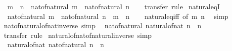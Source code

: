 \begin{isabellebody}
\ \ {\isachardoublequoteopen}m\ {\isacharequal}{\kern0pt}\ n\ {\isasymlongleftrightarrow}\ nat{\isacharunderscore}{\kern0pt}of{\isacharunderscore}{\kern0pt}natural\ m\ {\isacharequal}{\kern0pt}\ nat{\isacharunderscore}{\kern0pt}of{\isacharunderscore}{\kern0pt}natural\ n{\isachardoublequoteclose}\isanewline
%
\isadelimproof
\ \ %
\endisadelimproof
%
\isatagproof
{}\isamarkupfalse%
\ transfer\ rule%
\endisatagproof
{\isafoldproof}%
%
\isadelimproof
\isanewline
%
\endisadelimproof
\isanewline
{}\isamarkupfalse%
\ natural{\isacharunderscore}{\kern0pt}eqI{\isacharcolon}{\kern0pt}\isanewline
\ \ {\isachardoublequoteopen}nat{\isacharunderscore}{\kern0pt}of{\isacharunderscore}{\kern0pt}natural\ m\ {\isacharequal}{\kern0pt}\ nat{\isacharunderscore}{\kern0pt}of{\isacharunderscore}{\kern0pt}natural\ n\ {\isasymLongrightarrow}\ m\ {\isacharequal}{\kern0pt}\ n{\isachardoublequoteclose}\isanewline
%
\isadelimproof
\ \ %
\endisadelimproof
%
\isatagproof
{}\isamarkupfalse%
\ natural{\isacharunderscore}{\kern0pt}eq{\isacharunderscore}{\kern0pt}iff\ {\isacharbrackleft}{\kern0pt}of\ m\ n{\isacharbrackright}{\kern0pt}\ \isamarkupfalse%
\ simp%
\endisatagproof
{\isafoldproof}%
%
\isadelimproof
\isanewline
%
\endisadelimproof
\isanewline
{}\isamarkupfalse%
\ nat{\isacharunderscore}{\kern0pt}of{\isacharunderscore}{\kern0pt}natural{\isacharunderscore}{\kern0pt}of{\isacharunderscore}{\kern0pt}nat{\isacharunderscore}{\kern0pt}inverse\ {\isacharbrackleft}{\kern0pt}simp{\isacharbrackright}{\kern0pt}{\isacharcolon}{\kern0pt}\isanewline
\ \ {\isachardoublequoteopen}nat{\isacharunderscore}{\kern0pt}of{\isacharunderscore}{\kern0pt}natural\ {\isacharparenleft}{\kern0pt}natural{\isacharunderscore}{\kern0pt}of{\isacharunderscore}{\kern0pt}nat\ n{\isacharparenright}{\kern0pt}\ {\isacharequal}{\kern0pt}\ n{\isachardoublequoteclose}\isanewline
%
\isadelimproof
\ \ %
\endisadelimproof
%
\isatagproof
{}\isamarkupfalse%
\ transfer\ rule%
\endisatagproof
{\isafoldproof}%
%
\isadelimproof
\isanewline
%
\endisadelimproof
\isanewline
{}\isamarkupfalse%
\ natural{\isacharunderscore}{\kern0pt}of{\isacharunderscore}{\kern0pt}nat{\isacharunderscore}{\kern0pt}of{\isacharunderscore}{\kern0pt}natural{\isacharunderscore}{\kern0pt}inverse\ {\isacharbrackleft}{\kern0pt}simp{\isacharbrackright}{\kern0pt}{\isacharcolon}{\kern0pt}\isanewline
\ \ {\isachardoublequoteopen}natural{\isacharunderscore}{\kern0pt}of{\isacharunderscore}{\kern0pt}nat\ {\isacharparenleft}{\kern0pt}nat{\isacharunderscore}{\kern0pt}of{\isacharunderscore}{\kern0pt}natural\ n{\isacharparenright}{\kern0pt}\ {\isacharequal}{\kern0pt}\ n{\isachardoublequoteclose}\isanewline

\end{isabellebody}

